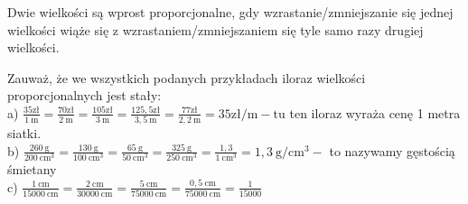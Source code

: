\documentclass[10pt]{article}
\begin{document}
Dwie wielkości są wprost proporcjonalne, gdy wzrastanie/zmniejszanie się jednej wielkości wiąże się z wzrastaniem/zmniejszaniem się tyle samo razy drugiej wielkości.

Zauważ, że we wszystkich podanych przykładach iloraz wielkości proporcjonalnych jest stały:\\
a) \(\frac{35 \mathrm{zł}}{1 \mathrm{~m}}=\frac{70 \mathrm{zł}}{2 \mathrm{~m}}=\frac{105 \mathrm{zł}}{3 \mathrm{~m}}=\frac{125,5 \mathrm{zł}}{3,5 \mathrm{~m}}=\frac{77 \mathrm{zł}}{2,2 \mathrm{~m}}=35 \mathrm{zł} / \mathrm{m}-\mathrm{tu}\) ten iloraz wyraża cenę 1 metra siatki.\\
b) \(\frac{260 \mathrm{~g}}{200 \mathrm{~cm}^{3}}=\frac{130 \mathrm{~g}}{100 \mathrm{~cm}^{3}}=\frac{65 \mathrm{~g}}{50 \mathrm{~cm}^{3}}=\frac{325 \mathrm{~g}}{250 \mathrm{~cm}^{3}}=\frac{1,3}{1 \mathrm{~cm}^{3}}=1,3 \mathrm{~g} / \mathrm{cm}^{3}-\) to nazywamy gęstością śmietany\\
c) \(\frac{1 \mathrm{~cm}}{15000 \mathrm{~cm}}=\frac{2 \mathrm{~cm}}{30000 \mathrm{~cm}}=\frac{5 \mathrm{~cm}}{75000 \mathrm{~cm}}=\frac{0,5 \mathrm{~cm}}{75000 \mathrm{~cm}}=\frac{1}{15000}\)
\end{document}
